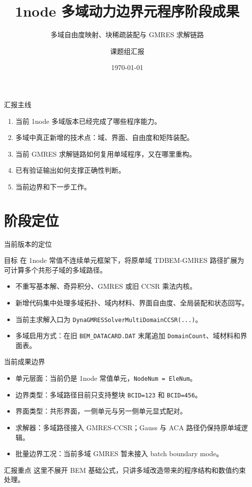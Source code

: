 \documentclass[aspectratio=169,UTF8]{ctexbeamer}
\title{1node 多域动力边界元程序阶段成果}
\subtitle{多域自由度映射、块稀疏装配与 GMRES 求解链路}
\author{课题组汇报}
\institute{DBEM 动力边界元程序}
\date{\today}
\newcommand{\code}[1]{\texttt{\small #1}}
\begin{document}
\begin{frame}
  \titlepage
\end{frame}

\begin{frame}{汇报主线}
  \begin{enumerate}
    \item 当前 1node 多域版本已经完成了哪些程序能力。
    \item 多域中真正新增的技术点：域、界面、自由度和矩阵装配。
    \item 当前 GMRES 求解链路如何复用单域程序，又在哪里重构。
    \item 已有验证输出如何支撑正确性判断。
    \item 当前边界和下一步工作。
  \end{enumerate}
\end{frame}

\section{阶段定位}

\begin{frame}{当前版本的定位}
  \begin{block}{目标}
    在 1node 常值不连续单元框架下，将原单域 TDBEM-GMRES 路径扩展为可计算多个共形子域的多域路径。
  \end{block}

  \begin{itemize}
    \item 不重写基本解、奇异积分、GMRES 或旧 CCSR 乘法内核。
    \item 新增代码集中处理多域拓扑、域内材料、界面自由度、全局装配和状态回写。
    \item 当前主求解入口为 \code{DynaGMRESSolverMultiDomainCCSR(...)}。
    \item 多域启用方式：在旧 \code{BEM\_DATACARD.DAT} 末尾追加 \code{DomainCount}、域材料和界面表。
  \end{itemize}
\end{frame}

\begin{frame}{当前成果边界}
  \begin{itemize}
    \item 单元层面：当前仍是 1node 常值单元，\code{NodeNum = EleNum}。
    \item 边界类型：多域路径目前只支持整块 \code{BCID=123} 和 \code{BCID=456}。
    \item 界面类型：共形界面，一侧单元与另一侧单元显式配对。
    \item 求解器：多域路径接入 GMRES-CCSR；Gauss 与 ACA 路径仍保持原单域逻辑。
    \item 批量边界工况：当前多域 GMRES 暂未接入 batch boundary mode。
  \end{itemize}

  \begin{alertblock}{汇报重点}
    这里不展开 BEM 基础公式，只讲多域改造带来的程序结构和数值约束处理。
  \end{alertblock}
\end{frame}
\end{document}
